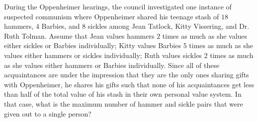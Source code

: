During the Oppenheimer hearings, the council investigated one instance of suspected communism where Oppenheimer shared his teenage stash of $18$ hammers, $4$ Barbies, and $8$ sickles among Jean Tatlock, Kitty Vissering, and Dr. Ruth Tolman. Assume that Jean values hammers $2$ times as much as she values either sickles or Barbies individually; Kitty values Barbies $5$ times as much as she values either hammers or sickles individually; Ruth values sickles $2$ times as much as she values either hammers or Barbies individually. Since all of these acquaintances are under the impression that they are the only ones sharing gifts with Oppenheimer, he shares his gifts such that none of his acquaintances get less than half of the total value of his stash in their own personal value system. In that case, what is the maximum number of hammer and sickle pairs that were given out to a single person?
